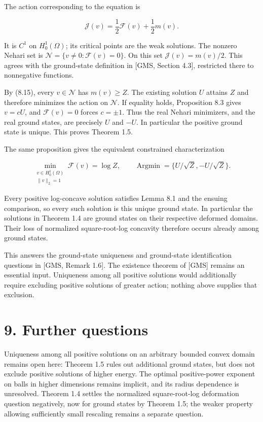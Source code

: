 \documentclass[11pt]{article}
\begin{document}
The action corresponding to the equation is

\[\mathcal J(v)=\frac12\mathcal F(v)+\frac12m(v).\tag{8.19}\]

It is \(C^1\) on \(H^1_0(\Omega)\); its critical points are the weak
solutions. The nonzero Nehari set is
\(\mathcal N=\{v\neq0:\mathcal F(v)=0\}\). On this set
\(\mathcal J(v)=m(v)/2\). This agrees with the ground-state definition
in {[}GMS, Section 4.3{]}, restricted there to nonnegative functions.

By (8.15), every \(v\in\mathcal N\) has \(m(v)\geq Z\). The existing
solution \(U\) attains \(Z\) and therefore minimizes the action on
\(\mathcal N\). If equality holds, Proposition 8.3 gives \(v=cU\), and
\(\mathcal F(v)=0\) forces \(c=\pm1\). Thus the real Nehari minimizers,
and the real ground states, are precisely \(U\) and \(-U\). In
particular the positive ground state is unique. This proves Theorem 1.5.

The same proposition gives the equivalent constrained characterization

\[\min_{\substack{v\in H^1_0(\Omega)\\ \|v\|_2=1}}\mathcal F(v)=\log Z,
\qquad\operatorname{Argmin}=\{U/\sqrt Z,-U/\sqrt Z\}.\tag{8.20}\]

Every positive log-concave solution satisfies Lemma 8.1 and the ensuing
comparison, so every such solution is this unique ground state. In
particular the solutions in Theorem 1.4 are ground states on their
respective deformed domains. Their loss of normalized square-root-log
concavity therefore occurs already among ground states.

This answers the ground-state uniqueness and ground-state identification
questions in {[}GMS, Remark 1.6{]}. The existence theorem of {[}GMS{]}
remains an essential input. Uniqueness among all positive solutions
would additionally require excluding positive solutions of greater
action; nothing above supplies that exclusion.

\section{9. Further questions}\label{further-questions}

Uniqueness among all positive solutions on an arbitrary bounded convex
domain remains open here: Theorem 1.5 rules out additional ground
states, but does not exclude positive solutions of higher energy. The
optimal positive-power exponent on balls in higher dimensions remains
implicit, and its radius dependence is unresolved. Theorem 1.4 settles
the normalized square-root-log deformation question negatively, now for
ground states by Theorem 1.5; the weaker property allowing sufficiently
small rescaling remains a separate question.
\end{document}
